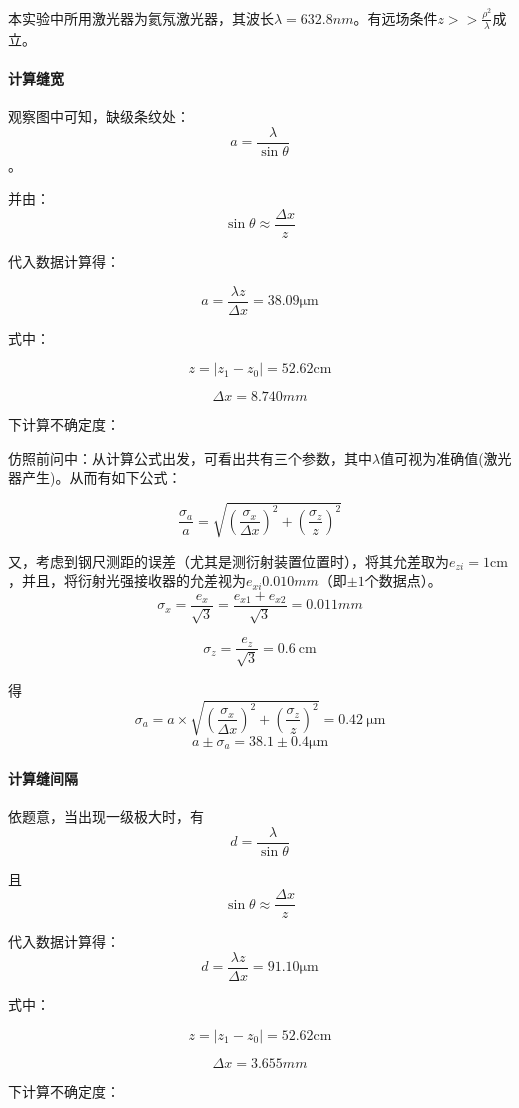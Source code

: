 \documentclass{ctexart}
\begin{document}
本实验中所用激光器为氦氖激光器，其波长$\lambda=632.8\si{nm}$。有远场条件$z>>\frac{\rho^2}{\lambda}$成立。

\paragraph{计算缝宽}

观察图中可知，缺级条纹处：$$a=\frac{\lambda}{\sin{\theta}}$$。

并由：
$$\sin{\theta}\approx \frac{\Delta x}{z}$$

代入数据计算得：

$$a=\frac{\lambda z}{\Delta x}=38.09\si{\micro \meter}$$

式中：

$$ z=|z_1-z_0|=52.62\si{\centi \meter}$$

$$ \Delta x=8.740\si{mm}$$

下计算不确定度：

仿照前问中：从计算公式出发，可看出共有三个参数，其中$\lambda$值可视为准确值(激光器产生)。从而有如下公式：

$$\frac{\sigma_a}a=\sqrt{(\frac{\sigma_x}{\Delta x})^2+(\frac{\sigma_z}z)^2}$$

又，考虑到钢尺测距的误差（尤其是测衍射装置位置时），将其允差取为$e_{zi}=1\si{\centi\meter} $，并且，将衍射光强接收器的允差视为$e_{xi}0.010\si{mm}$（即$\pm 1$个数据点）。
$$\sigma_x=\frac{e_x}{\sqrt{3}}=\frac{e_{x1}+e_{x2}}{\sqrt{3}}=0.011\si{mm}$$

$$\sigma_z=\frac{e_z}{\sqrt{3}}=\SI{0.6}{\centi\meter}$$

得$$\sigma_a=a\times\sqrt{(\frac{\sigma_x}{\Delta x})^2+(\frac{\sigma_z}z)^2}=\SI{0.42}{\micro \meter}  $$ 
$$a \pm \sigma_a=38.1\pm 0.4 \si{\micro \meter}$$

\paragraph{计算缝间隔}

依题意，当出现一级极大时，有$$d=\frac{\lambda}{\sin{\theta}}$$

且$$\sin{\theta}\approx \frac{\Delta x}{z}$$

代入数据计算得：$$d=\frac{\lambda z}{\Delta x}=91.10\si{\micro \meter}$$

式中：

$$ z=|z_1-z_0|=52.62\si{\centi \meter}$$

$$ \Delta x=3.655\si{mm}$$

下计算不确定度：
\end{document}

